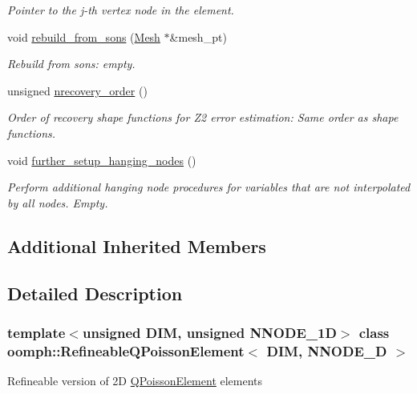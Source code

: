 \begin{DoxyCompactItemize}
\begin{DoxyCompactList}\small\item\em Pointer to the j-\/th vertex node in the element. \end{DoxyCompactList}\item 
void \hyperlink{classoomph_1_1RefineableQPoissonElement_abb65373718eab9b04a0eb5786ae6559c}{rebuild\+\_\+from\+\_\+sons} (\hyperlink{classoomph_1_1Mesh}{Mesh} $\ast$\&mesh\+\_\+pt)
\begin{DoxyCompactList}\small\item\em Rebuild from sons\+: empty. \end{DoxyCompactList}\item 
unsigned \hyperlink{classoomph_1_1RefineableQPoissonElement_a0f8a91fd025517b21f69c0e544daec7a}{nrecovery\+\_\+order} ()
\begin{DoxyCompactList}\small\item\em Order of recovery shape functions for Z2 error estimation\+: Same order as shape functions. \end{DoxyCompactList}\item 
void \hyperlink{classoomph_1_1RefineableQPoissonElement_afe7fd0310ac9f03550ea83239cd57d40}{further\+\_\+setup\+\_\+hanging\+\_\+nodes} ()
\begin{DoxyCompactList}\small\item\em Perform additional hanging node procedures for variables that are not interpolated by all nodes. Empty. \end{DoxyCompactList}\end{DoxyCompactItemize}
\subsection*{Additional Inherited Members}


\subsection{Detailed Description}
\subsubsection*{template$<$unsigned D\+IM, unsigned N\+N\+O\+D\+E\+\_\+1D$>$\newline
class oomph\+::\+Refineable\+Q\+Poisson\+Element$<$ D\+I\+M, N\+N\+O\+D\+E\+\_\+D $>$}

Refineable version of 2D \hyperlink{classoomph_1_1QPoissonElement}{Q\+Poisson\+Element} elements 

